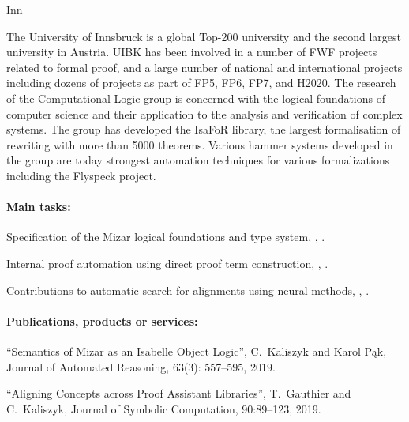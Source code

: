 \begin{sitedescription}{Inn}

The University of Innsbruck is a global Top-200 university and the second
largest university in Austria. UIBK has been involved in a number of FWF
projects related to formal proof, and a large number of national and
international projects including dozens of projects as part of FP5,
FP6, FP7, and H2020.
%
The research of the Computational Logic group is concerned with the logical
foundations of computer science and their application to the analysis and
verification of complex systems. The group has developed the IsaFoR library,
the largest formalisation of rewriting with more than 5000 theorems. Various
hammer systems developed in the group are today strongest automation techniques
for various formalizations including the Flyspeck project.

\paragraph*{Main tasks:}

\begin{compactitem}
\item Specification of the Mizar logical foundations and type system, , .
\item Internal proof automation using direct proof term construction, %
  , .
\item Contributions to automatic search for alignments using neural methods, , .
\end{compactitem}

\paragraph*{Publications, products or services:}

\begin{compactitem}
\item ``Semantics of Mizar as an Isabelle Object Logic'', C.~Kaliszyk and Karol Pąk, Journal of Automated Reasoning, 63(3): 557--595, 2019.

\item ``Aligning Concepts across Proof Assistant Libraries'', T.~Gauthier and C.~Kaliszyk, Journal of Symbolic Computation, 90:89--123, 2019.


\end{compactitem}
\end{sitedescription}
